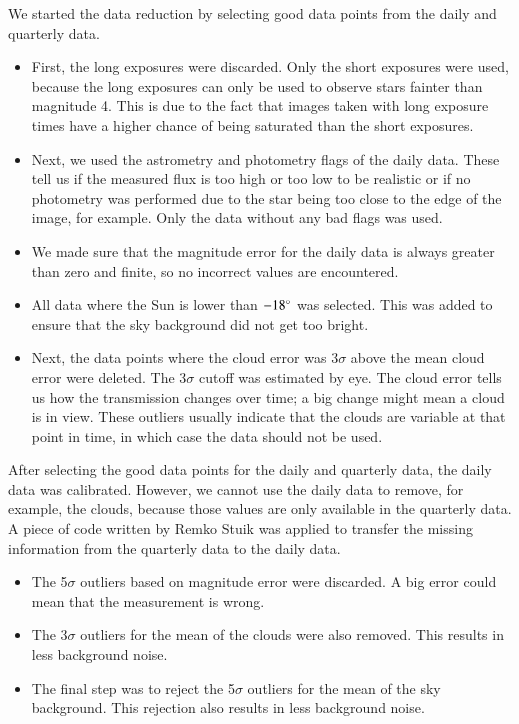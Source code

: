 \documentclass{aa}
\begin{document}
We started the data reduction by selecting good data points from the daily and quarterly data. 
\begin{itemize}
    \item First, the long exposures were discarded. Only the short exposures were used, because the long exposures can only be used to observe stars fainter than magnitude 4. This is due to the fact that images taken with long exposure times have a higher chance of being saturated than the short exposures.
    \item Next, we used the astrometry and photometry flags of the daily data. These tell us if the measured flux is too high or too low to be realistic or if no photometry was performed due to the star being too close to the edge of the image, for example. Only the data without any bad flags was used. 
    \item We made sure that the magnitude error for the daily data is always greater than zero and finite, so no incorrect values are encountered.
    \item All data where the Sun is lower than $-18^\circ$ was selected. This was added to ensure that the sky background did not get too bright. 
    \item Next, the data points where the cloud error was 3$\sigma$ above the mean cloud error were deleted. The 3$\sigma$ cutoff was estimated by eye. The cloud error tells us how the transmission changes over time; a big change might mean a cloud is in view. These outliers usually indicate that the clouds are variable at that point in time, in which case the data should not be used.
\end{itemize}
After selecting the good data points for the daily and quarterly data, the daily data was calibrated. However, we cannot use the daily data to remove, for example, the clouds, because those values are only available in the quarterly data. A piece of code written by Remko Stuik was applied to transfer the missing information from the quarterly data to the daily data. 
\begin{itemize}
    \item The 5$\sigma$ outliers based on magnitude error were discarded. A big error could mean that the measurement is wrong. 
    \item The 3$\sigma$ outliers for the mean of the clouds were also removed. This results in less background noise.
    \item The final step was to reject the 5$\sigma$ outliers for the mean of the sky background. This rejection also results in less background noise.
\end{itemize}
\end{document}
